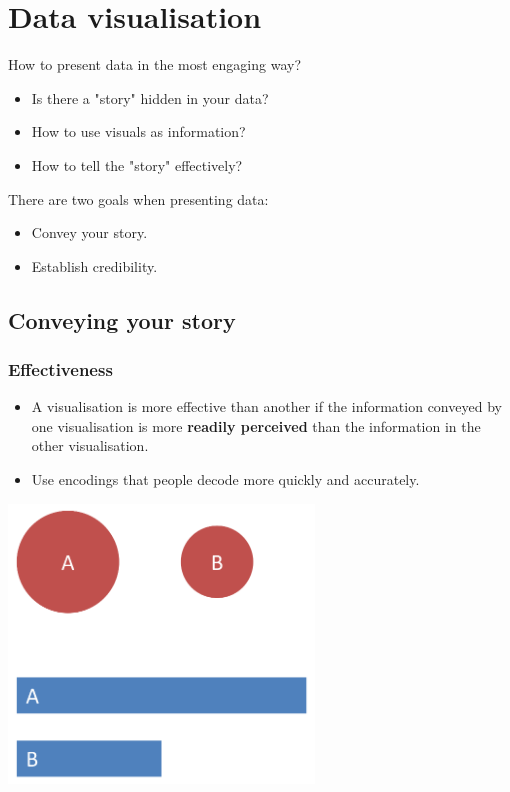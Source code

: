 \documentclass[11pt]{article}
\begin{document}
\section{Data visualisation}
\label{sec:org7bfcce9}
How to present data in the most engaging way?
\begin{itemize}
\item Is there a "story" hidden in your data?
\item How to use visuals as information?
\item How to tell the "story" effectively?
\end{itemize}

There are two goals when presenting data:
\begin{itemize}
\item Convey your story.
\item Establish credibility.
\end{itemize}
\subsection{Conveying your story}
\label{sec:org5613002}

\subsubsection{Effectiveness}
\label{sec:orgb26f1e9}
\begin{itemize}
\item A visualisation is more effective than another if the information conveyed by one visualisation is more \textbf{readily perceived} than the information in the other visualisation.
\item Use encodings that people decode more quickly and accurately.
\end{itemize}

\begin{center}
\includegraphics[height=20em]{./images/data-visualisation-effectiveness-diagram.png}
\end{center}
\end{document}
